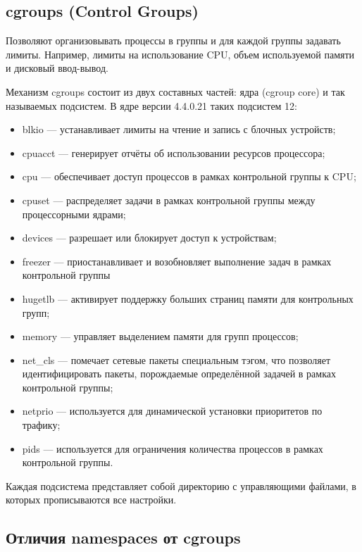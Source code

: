 \subsection{cgroups (Control Groups)}

Позволяют организовывать процессы в группы и для каждой группы задавать лимиты. Например, лимиты на использование CPU, объем используемой памяти и дисковый ввод-вывод.

Механизм cgroups состоит из двух составных частей: ядра (cgroup core) и так называемых подсистем. В ядре версии 4.4.0.21 таких подсистем 12:

\begin{itemize}
   \item blkio — устанавливает лимиты на чтение и запись с блочных устройств;
    \item cpuacct — генерирует отчёты об использовании ресурсов процессора;
    \item cpu — обеспечивает доступ процессов в рамках контрольной группы к CPU;
    \item cpuset — распределяет задачи в рамках контрольной группы между процессорными ядрами;
    \item devices — разрешает или блокирует доступ к устройствам;
    \item freezer — приостанавливает и возобновляет выполнение задач в рамках контрольной группы
    \item hugetlb — активирует поддержку больших страниц памяти для контрольных групп;
    \item memory — управляет выделением памяти для групп процессов;
    \item net\_cls — помечает сетевые пакеты специальным тэгом, что позволяет идентифицировать пакеты, порождаемые определённой задачей в рамках контрольной группы;
    \item netprio — используется для динамической установки приоритетов по трафику;
    \item pids — используется для ограничения количества процессов в рамках контрольной группы.
\end{itemize}

Каждая подсистема представляет собой директорию с управляющими файлами, в которых прописываются все настройки.  

\subsection{Отличия namespaces от cgroups}

